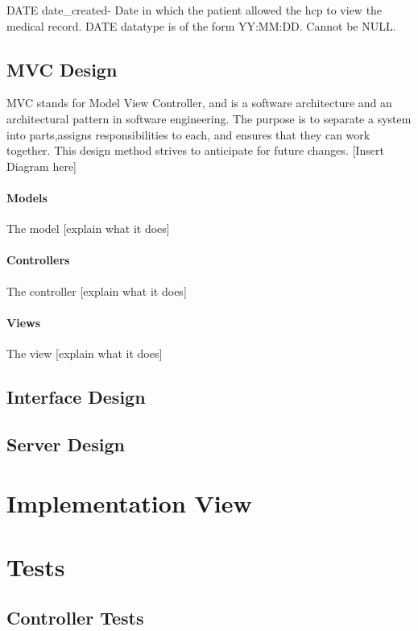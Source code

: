 \documentclass[12pt]{report}
\begin{document}
DATE date_created-  Date in which the patient allowed the hcp to view the medical record.  DATE datatype is of the form YY:MM:DD.  Cannot be NULL.\\


\subsection{MVC Design}

MVC stands for Model View Controller, and is a software architecture and an architectural pattern in software engineering. The purpose is to separate a system into parts,assigns responsibilities to each, and ensures that they can work together. This design method strives to anticipate for future changes.
[Insert Diagram here]
\paragraph{Models}
The model [explain what it does]

\paragraph{Controllers}
The controller [explain what it does]

\paragraph{Views}
The view [explain what it does]

\subsection{Interface Design}
\subsection{Server Design}

\section{Implementation View}

\section{Tests}

\subsection{Controller Tests}
\end{document}
